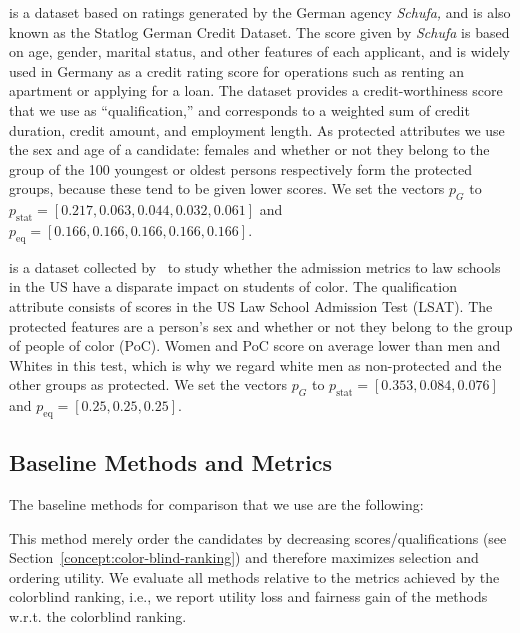  is a dataset based on ratings generated by the German agency \emph{Schufa,} and is also known as the Statlog German Credit Dataset.
%
The score given by \emph{Schufa} is based on age, gender, marital status, and other features of each applicant, and is widely used in Germany as a credit rating score for operations such as renting an apartment or applying for a loan.
%
The dataset provides a credit-worthiness score that we use as ``qualification,'' and corresponds to a weighted sum of credit duration, credit amount, and employment length.
%
As protected attributes we use the sex and age of a candidate: females and whether or not they belong to the group of the 100 youngest or oldest persons respectively form the protected groups, because these tend to be given lower scores.
%
We set the vectors $p_G$ to $p_{\text{stat}}=[0.217,0.063,0.044,0.032,0.061]$ and $p_{\text{eq}}=[0.166,0.166,0.166,0.166,0.166]$.


 is a dataset collected by~\citet{wightman1998lsac} to study whether the admission metrics to law schools in the US have a disparate impact on students of color.
%
The qualification attribute consists of scores in the US Law School Admission Test (LSAT).
%
The protected features are a person's sex and whether or not they belong to the group of people of color (PoC).
%
Women and PoC score on average lower than men and Whites in this test, which is why we regard white men as non-protected and the other groups as protected.
%
We set the vectors $p_G$ to $p_{\text{stat}}=[0.353,0.084,0.076]$ and $p_{\text{eq}}=[0.25,0.25,0.25]$.


\subsection{Baseline Methods and Metrics}\label{sec:experiments-baselines}

The baseline methods for comparison that we use are the following:

 This method merely order the candidates by decreasing scores/qualifications (see Section~\ref{concept:color-blind-ranking}) and therefore maximizes selection and ordering utility.
%
We evaluate all methods relative to the metrics achieved by the colorblind ranking, i.e., we report utility loss and fairness gain of the methods w.r.t. the colorblind ranking.

